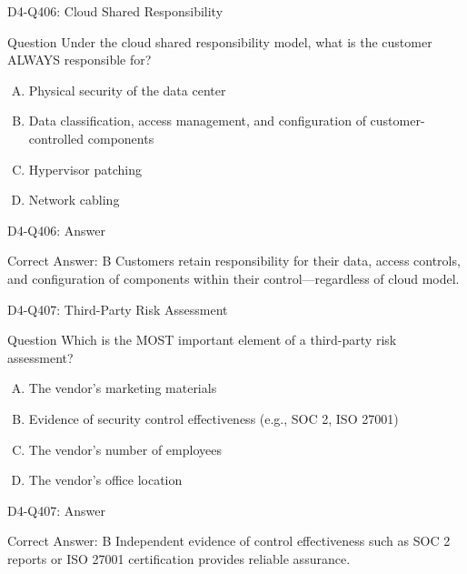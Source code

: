 \documentclass{beamer}
\begin{document}
\begin{frame}{D4-Q406: Cloud Shared Responsibility}
	\begin{block}{Question}
		Under the cloud shared responsibility model, what is the customer ALWAYS responsible for?
	\end{block}
	\begin{enumerate}[(A)]
		\item Physical security of the data center
		\item Data classification, access management, and configuration of customer-controlled components
		\item Hypervisor patching
		\item Network cabling
	\end{enumerate}
\end{frame}
\begin{frame}{D4-Q406: Answer}
	\begin{block}{Correct Answer: B}
		Customers retain responsibility for their data, access controls, and configuration of components within their control—regardless of cloud model.
	\end{block}
\end{frame}

\begin{frame}{D4-Q407: Third-Party Risk Assessment}
	\begin{block}{Question}
		Which is the MOST important element of a third-party risk assessment?
	\end{block}
	\begin{enumerate}[(A)]
		\item The vendor's marketing materials
		\item Evidence of security control effectiveness (e.g., SOC 2, ISO 27001)
		\item The vendor's number of employees
		\item The vendor's office location
	\end{enumerate}
\end{frame}
\begin{frame}{D4-Q407: Answer}
	\begin{block}{Correct Answer: B}
		Independent evidence of control effectiveness such as SOC 2 reports or ISO 27001 certification provides reliable assurance.
	\end{block}
\end{frame}
\end{document}
